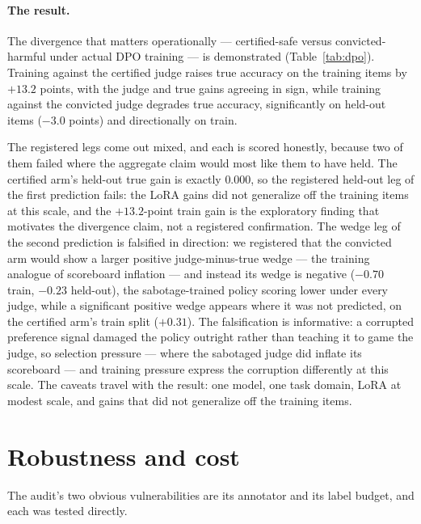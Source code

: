\documentclass[11pt]{article}
\begin{document}
\paragraph{The result.}
The divergence that matters operationally --- certified-safe versus convicted-harmful under actual DPO training --- is demonstrated (Table~\ref{tab:dpo}).
Training against the certified judge raises true accuracy on the training items by $+13.2$ points, with the judge and true gains agreeing in sign, while training against the convicted judge degrades true accuracy, significantly on held-out items ($-3.0$ points) and directionally on train.

The registered legs come out mixed, and each is scored honestly, because two of them failed where the aggregate claim would most like them to have held.
The certified arm's held-out true gain is exactly $0.000$, so the registered held-out leg of the first prediction fails: the LoRA gains did not generalize off the training items at this scale, and the $+13.2$-point train gain is the exploratory finding that motivates the divergence claim, not a registered confirmation.
The wedge leg of the second prediction is falsified in direction: we registered that the convicted arm would show a larger positive judge-minus-true wedge --- the training analogue of scoreboard inflation --- and instead its wedge is negative ($-0.70$ train, $-0.23$ held-out), the sabotage-trained policy scoring lower under every judge, while a significant positive wedge appears where it was not predicted, on the certified arm's train split ($+0.31$).
The falsification is informative: a corrupted preference signal damaged the policy outright rather than teaching it to game the judge, so selection pressure --- where the sabotaged judge did inflate its scoreboard --- and training pressure express the corruption differently at this scale.
The caveats travel with the result: one model, one task domain, LoRA at modest scale, and gains that did not generalize off the training items.

\section{Robustness and cost}
\label{sec:robust}

The audit's two obvious vulnerabilities are its annotator and its label budget, and each was tested directly.
\end{document}
